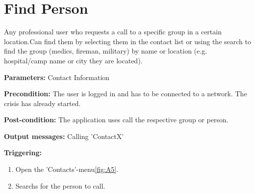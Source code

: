 \section{Find Person}
\label{operation:FindPerson}
Any professional user who requests a call to a specific group in a certain
location.Can find them by selecting them in the contact list or using the search
to find the group (medics, fireman, military) by name or location (e.g. hospital/camp name or city they are located).\\
\begin{description}
\item \textbf{Parameters:} Contact Information
\item \textbf{Precondition:} The user is logged in and has to be connected to a
network. The crisis has already started.
\item \textbf{Post-condition:} The application uses call the respective group or person.
\item \textbf{Output messages:} Calling 'ContactX'
\item \textbf{Triggering:}
\begin{enumerate}
\item Open the 'Contacts'-menu\ref{fig:A5}.
\item Searchs for the person to call.
\end{enumerate}
\end{description} 

